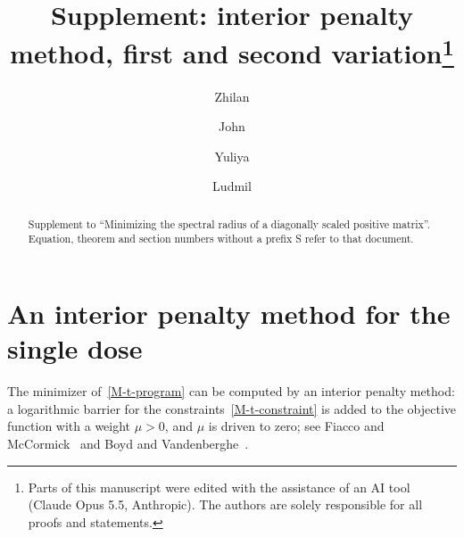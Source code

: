 \documentclass[11pt]{article}
\title{Supplement: interior penalty method, first and second variation\thanks{Parts of this manuscript were edited with the assistance of an AI tool (Claude Opus 5.5, Anthropic). The authors are solely responsible for all proofs and statements.}}
\author{Zhilan \and John \and Yuliya \and Ludmil}
\date{}
\theoremstyle{plain}
\theoremstyle{remark}
\numberwithin{equation}{section}
\begin{document}
\maketitle

\begin{abstract}
Supplement to ``Minimizing the spectral radius of a diagonally scaled positive
matrix''. Equation, theorem and section numbers without a prefix S refer to
that document.
\end{abstract}

\section{An interior penalty method for the single dose}\label{sec-barrier}

The minimizer of~\eqref{M-t-program} can be computed by an interior penalty
method: a logarithmic barrier for the constraints~\eqref{M-t-constraint} is
added to the objective function with a weight $\mu>0$, and $\mu$ is driven to
zero; see Fiacco and McCormick~\cite{1968Fiacco_McCormick} and Boyd and
Vandenberghe~\cite[Chapter 11]{2004Boyd_Vandenberghe}.
\end{document}
